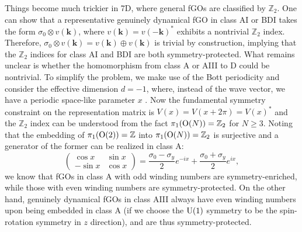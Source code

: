 \documentclass[prl,twocolumn,preprintnumbers,superscriptaddress,amsmath,amssymb]{revtex4-1}
\begin{document}
Things become much trickier in 7D, where general fGOs are classified by $\mathbb{Z}_2$. One can show that a representative genuinely dynamical fGO in class AI or BDI takes the form $\sigma_0\otimes v(\boldsymbol{k})$, where $v(\boldsymbol{k})=v(-\boldsymbol{k})^*$ exhibits a nontrivial $\mathbb{Z}_2$ index. Therefore,  $\sigma_0\otimes v(\boldsymbol{k})= v(\boldsymbol{k})\oplus v(\boldsymbol{k})$ is trivial by construction, implying that the $\mathbb{Z}_2$ indices for class AI and BDI are both symmetry-protected. What remains unclear is whether the homomorphism from class A or AIII to D could be nontrivial. To simplify the problem, we make use of the Bott periodicity and consider the effective dimension $d=-1$, where, instead of the wave vector, we have a periodic space-like parameter $x$ \cite{Teo2010}. Now the fundamental symmetry constraint on the representation matrix is $V(x)=V(x+2\pi)=V(x)^*$ and the $\mathbb{Z}_2$ index can be understood from the fact $\pi_1({\rm O}(N))=\mathbb{Z}_2$ for $N\ge3$. Noting that the embedding of $\pi_1({\rm O}(2))=\mathbb{Z}$ into $\pi_1({\rm O}(N))=\mathbb{Z}_2$ is surjective and a generator of the former can be realized in class A:
\begin{equation}
\begin{pmatrix} \cos x & \sin x \\ -\sin x & \cos x \end{pmatrix} = \frac{\sigma_0-\sigma_y}{2}e^{-ix}
+ \frac{\sigma_0+\sigma_y}{2}e^{ix},
\end{equation}
we know that fGOs in class A with odd winding numbers are symmetry-enriched, while those with even winding numbers are symmetry-protected. On the other hand, genuinely dynamical fGOs in class AIII always have even winding numbers upon being embedded in class A (if we choose the ${\rm U}(1)$ symmetry to be the spin-rotation symmetry in $z$ direction), and are thus symmetry-protected.
\end{document}
